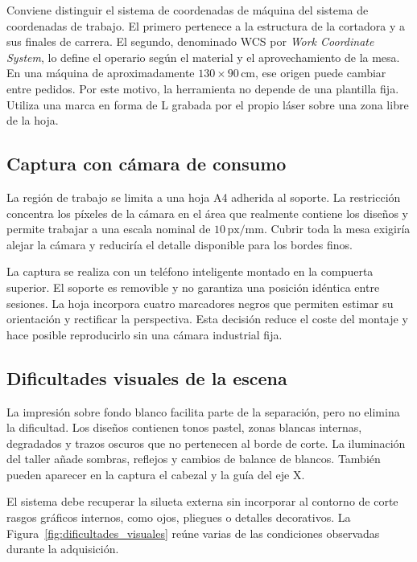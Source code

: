 Conviene distinguir el sistema de coordenadas de máquina del sistema de coordenadas de trabajo. El primero pertenece a la estructura de la cortadora y a sus finales de carrera. El segundo, denominado WCS por \textit{Work Coordinate System}, lo define el operario según el material y el aprovechamiento de la mesa. En una máquina de aproximadamente $130 \times 90\,\text{cm}$, ese origen puede cambiar entre pedidos. Por este motivo, la herramienta no depende de una plantilla fija. Utiliza una marca en forma de L grabada por el propio láser sobre una zona libre de la hoja.

\subsection{Captura con cámara de consumo}

La región de trabajo se limita a una hoja A4 adherida al soporte. La restricción concentra los píxeles de la cámara en el área que realmente contiene los diseños y permite trabajar a una escala nominal de $10\,\text{px/mm}$. Cubrir toda la mesa exigiría alejar la cámara y reduciría el detalle disponible para los bordes finos.

La captura se realiza con un teléfono inteligente montado en la compuerta superior. El soporte es removible y no garantiza una posición idéntica entre sesiones. La hoja incorpora cuatro marcadores negros que permiten estimar su orientación y rectificar la perspectiva. Esta decisión reduce el coste del montaje y hace posible reproducirlo sin una cámara industrial fija.

\subsection{Dificultades visuales de la escena}

La impresión sobre fondo blanco facilita parte de la separación, pero no elimina la dificultad. Los diseños contienen tonos pastel, zonas blancas internas, degradados y trazos oscuros que no pertenecen al borde de corte. La iluminación del taller añade sombras, reflejos y cambios de balance de blancos. También pueden aparecer en la captura el cabezal y la guía del eje X.

El sistema debe recuperar la silueta externa sin incorporar al contorno de corte rasgos gráficos internos, como ojos, pliegues o detalles decorativos. La Figura~\ref{fig:dificultades_visuales} reúne varias de las condiciones observadas durante la adquisición.

